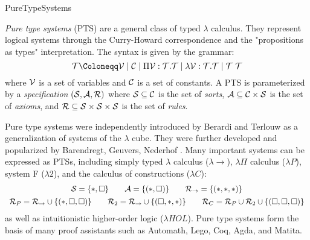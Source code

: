\begin{entry}{PureTypeSystems}
\begin{clarifications}
\emph{Pure type systems} (PTS) are a general class of typed $\lambda$ calculus. They represent logical systems through the Curry-Howard correspondence and the "propositions as types" interpretation. The syntax is given by the grammar:
\negvspace\[
  \terms \Coloneqq \variables \mid \constants \mid \Pi \variables : \terms. \terms \mid \lambda \variables : \terms. \terms \mid \terms~\terms
\negvspace\]
where $\mathcal{V}$ is a set of variables and $\mathcal{C}$ is a set of constants.
A PTS is parameterized by a \emph{specification} $(\mathcal{S}, \mathcal{A}, \mathcal{R})$ where
$\mathcal{S} \subseteq \mathcal{C}$ is the set of \emph{sorts},
$\mathcal{A} \subseteq \mathcal{C} \times \mathcal{S}$ is the set of \emph{axioms}, and
$\mathcal{R} \subseteq \mathcal{S} \times \mathcal{S} \times \mathcal{S}$ is the set of \emph{rules}.
\end{clarifications}

\begin{history}
Pure type systems were independently introduced by Berardi and Terlouw as a generalization of systems of the $\lambda$ cube. They were further developed and popularized by Barendregt, Geuvers, Nederhof \cite{geuvers_modular_1991,barendregt_introduction_1991,barendregt_lambda_1992,geuvers_logics_1993}. Many important systems can be expressed as PTSs, including simply typed $\lambda$ calculus ($\lambda{\rightarrow}$), $\lambda\Pi$ calculus  ($\lambda{P}$), system F  ($\lambda{2}$), and the calculus of constructions ($\lambda{C}$):
\negvspace\[
  \begin{array}{cc}
    \sorts = \{\Prop, \Type\} \qquad \axioms = \{(\Prop, \Type)\} \qquad \rules_{\rightarrow} = \{(\Prop, \Prop, \Prop)\} \\[1ex]
    \rules_{P} = \rules_{\rightarrow} \union \{(\Prop,\Type,\Type)\} \qquad
    \rules_{2} = \rules_{\rightarrow} \union \{(\Type,\Prop,\Prop)\} \qquad
    \rules_{C} = \rules_{P} \union \rules_{2} \union \{(\Type,\Type,\Type)\}
  \end{array}
\negvspace\]
as well as intuitionistic higher-order logic ($\lambda{HOL}$). Pure type systems form the basis of many proof assistants such as Automath, Lego, Coq, Agda, and Matita.
\end{history}


\end{entry}
